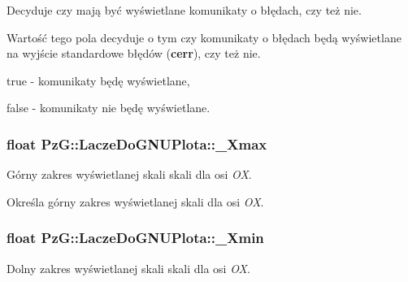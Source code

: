 Decyduje czy mają być wyświetlane komunikaty o błędach, czy też nie. 

Wartość tego pola decyduje o tym czy komunikaty o błędach będą wyświetlane na wyjście standardowe błędów ({\bfseries cerr}), czy też nie. \begin{DoxyItemize}
\item {\ttfamily true} -\/ komunikaty będę wyświetlane, \item {\ttfamily false} -\/ komunikaty nie będę wyświetlane. \end{DoxyItemize}
\hypertarget{class_pz_g_1_1_lacze_do_g_n_u_plota_a847e00678a413ab076ccbcb7eba3ae58}{
\subsubsection[{\+\_\+\+Xmax}]{\setlength{\rightskip}{0pt plus 5cm}float Pz\+G\+::\+Lacze\+Do\+G\+N\+U\+Plota\+::\+\_\+\+Xmax\hspace{0.3cm}{\ttfamily [protected]}}}\label{class_pz_g_1_1_lacze_do_g_n_u_plota_a847e00678a413ab076ccbcb7eba3ae58}


Górny zakres wyświetlanej skali skali dla osi {\itshape O\+X}. 

Określa górny zakres wyświetlanej skali dla osi {\itshape O\+X}. \hypertarget{class_pz_g_1_1_lacze_do_g_n_u_plota_a69d530edfe769e38448972e897456deb}{
\subsubsection[{\+\_\+\+Xmin}]{\setlength{\rightskip}{0pt plus 5cm}float Pz\+G\+::\+Lacze\+Do\+G\+N\+U\+Plota\+::\+\_\+\+Xmin\hspace{0.3cm}{\ttfamily [protected]}}}\label{class_pz_g_1_1_lacze_do_g_n_u_plota_a69d530edfe769e38448972e897456deb}


Dolny zakres wyświetlanej skali skali dla osi {\itshape O\+X}. 

